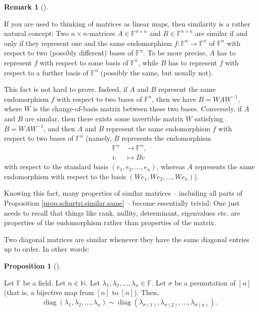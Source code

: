 \documentclass[numbers=enddot,12pt,final,onecolumn,notitlepage]{scrartcl}%
\numberwithin{exer}{subsection}
\theoremstyle{definition}
\newtheorem{prop}[theo]{Proposition}
\newenvironment{proposition}[1][]
{\begin{prop}[#1]\begin{leftbar}}
{\end{leftbar}\end{prop}}
\newtheorem{remk}[theo]{Remark}
\newenvironment{remark}[1][]
{\begin{remk}[#1]\begin{leftbar}}
{\end{leftbar}\end{remk}}
\begin{document}
\begin{remark}
If you are used to thinking of matrices as linear maps, then similarity is a
rather natural concept: Two $n\times n$-matrices $A\in\mathbb{F}^{n\times n}$
and $B\in\mathbb{F}^{n\times n}$ are similar if and only if they represent one
and the same endomorphism $f:\mathbb{F}^{n}\rightarrow\mathbb{F}^{n}$ of
$\mathbb{F}^{n}$ with respect to two (possibly different) bases of
$\mathbb{F}^{n}$. To be more precise, $A$ has to represent $f$ with respect to
some basis of $\mathbb{F}^{n}$, while $B$ has to represent $f$ with respect to
a further basis of $\mathbb{F}^{n}$ (possibly the same, but usually not).

This fact is not hard to prove. Indeed, if $A$ and $B$ represent the same
endomorphism $f$ with respect to two bases of $\mathbb{F}^{n}$, then we have
$B=WAW^{-1}$, where $W$ is the change-of-basis matrix between these two bases.
Conversely, if $A$ and $B$ are similar, then there exists some invertible
matrix $W$ satisfying $B=WAW^{-1}$, and then $A$ and $B$ represent the same
endomorphism $f$ with respect to two bases of $\mathbb{F}^{n}$ (namely, $B$
represents the endomorphism%
\begin{align*}
\mathbb{F}^{n}  &  \rightarrow\mathbb{F}^{n},\\
v  &  \mapsto Bv
\end{align*}
with respect to the standard basis $\left(  e_{1},e_{2},\ldots,e_{n}\right)
$, whereas $A$ represents the same endomorphism with respect to the basis
$\left(  We_{1},We_{2},\ldots,We_{n}\right)  $).

Knowing this fact, many properties of similar matrices -- including all parts
of Proposition \ref{prop.schurtri.similar.same} -- become essentially trivial:
One just needs to recall that things like rank, nullity, determinant,
eigenvalues etc. are properties of the endomorphism rather than properties of
the matrix.
\end{remark}

Two diagonal matrices are similar whenever they have the same diagonal entries
up to order. In other words:

\begin{proposition}
\label{prop.schurtri.similar.diag}Let $\mathbb{F}$ be a field. Let
$n\in\mathbb{N}$. Let $\lambda_{1},\lambda_{2},\ldots,\lambda_{n}\in
\mathbb{F}$. Let $\sigma$ be a permutation of $\left[  n\right]  $ (that is, a
bijective map from $\left[  n\right]  $ to $\left[  n\right]  $). Then,%
\[
\operatorname*{diag}\left(  \lambda_{1},\lambda_{2},\ldots,\lambda_{n}\right)
\sim\operatorname*{diag}\left(  \lambda_{\sigma\left(  1\right)  }%
,\lambda_{\sigma\left(  2\right)  },\ldots,\lambda_{\sigma\left(  n\right)
}\right)  .
\]

\end{proposition}
\end{document}
